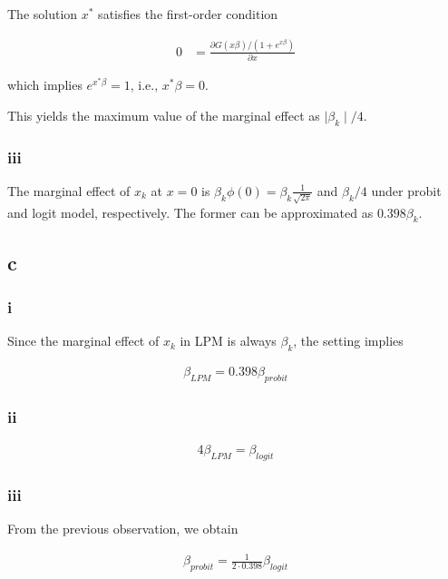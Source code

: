 \documentclass[11pt]{article}
\begin{document}
The solution $x^*$ satisfies the first-order condition

\begin{align*}
    0 &= \frac{\partial G(x\beta) / (1 + e^{x\beta})}{\partial x}
\end{align*}

which implies $e^{x^*\beta} = 1$, i.e., $x^*\beta = 0$.

This yields the maximum value of the marginal effect as $\mid \beta_k \mid /4$.



\subsubsection*{iii}

The marginal effect of $x_k$ at $x = 0$ is $\beta_k \phi(0) = \beta_k \frac{1}{\sqrt{2\pi}}$ and $\beta_k / 4$ under probit and logit model, respectively. The former can be approximated as $0.398 \beta_k$.


\subsection*{c}
\subsubsection*{i}

Since the marginal effect of $x_k$ in LPM is always $\beta_k$, the setting implies

\begin{align*}
    \beta_{LPM} = 0.398 \beta_{probit}
\end{align*}

\subsubsection*{ii}

\begin{align*}
    4 \beta_{LPM} = \beta_{logit}
\end{align*}

\subsubsection*{iii}

From the previous observation, we obtain

\begin{align*}
    \beta_{probit} = \frac{1}{2 \cdot 0.398}\beta_{logit}
\end{align*}
\end{document}

